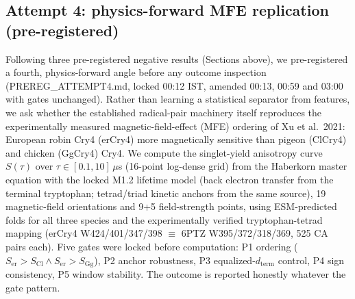 \documentclass[12pt,a4paper]{article}
\begin{document}
\subsection{Attempt 4: physics-forward MFE replication (pre-registered)}
Following three pre-registered negative results (Sections above), we pre-registered a fourth, physics-forward angle before any outcome inspection (PREREG\_ATTEMPT4.md, locked 00:12 IST, amended 00:13, 00:59 and 03:00 with gates unchanged). Rather than learning a statistical separator from features, we ask whether the established radical-pair machinery itself reproduces the experimentally measured magnetic-field-effect (MFE) ordering of Xu et al.\ 2021: European robin Cry4 (erCry4) more magnetically sensitive than pigeon (ClCry4) and chicken (GgCry4) Cry4. We compute the singlet-yield anisotropy curve $S(\tau)$ over $\tau \in [0.1, 10]\,\mu$s (16-point log-dense grid) from the Haberkorn master equation with the locked M1.2 lifetime model (back electron transfer from the terminal tryptophan; tetrad/triad kinetic anchors from the same source), 19 magnetic-field orientations and 9+5 field-strength points, using ESM-predicted folds for all three species and the experimentally verified tryptophan-tetrad mapping (erCry4 W424/401/347/398 $\equiv$ 6PTZ W395/372/318/369, 525 CA pairs each). Five gates were locked before computation: P1 ordering ($S_{\mathrm{er}} > S_{\mathrm{Cl}} \wedge S_{\mathrm{er}} > S_{\mathrm{Gg}}$), P2 anchor robustness, P3 equalized-$d_{\mathrm{term}}$ control, P4 sign consistency, P5 window stability. The outcome is reported honestly whatever the gate pattern.
\end{document}
